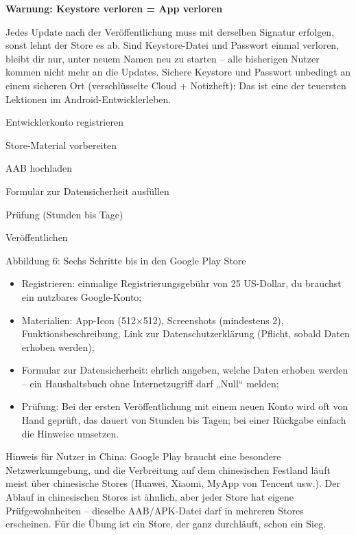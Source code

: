 \textbf{Warnung: Keystore verloren = App verloren}\par

Jedes Update nach der Veröffentlichung muss mit derselben Signatur erfolgen, sonst lehnt der Store es ab. Sind Keystore-Datei und Passwort einmal verloren, bleibt dir nur, unter neuem Namen neu zu starten – alle bisherigen Nutzer kommen nicht mehr an die Updates. Sichere Keystore und Passwort unbedingt an einem sicheren Ort (verschlüsselte Cloud + Notizheft): Das ist eine der teuersten Lektionen im Android-Entwicklerleben.


Entwicklerkonto registrieren

Store-Material vorbereiten

AAB hochladen

Formular zur Datensicherheit ausfüllen

Prüfung (Stunden bis Tage)

Veröffentlichen

\begin{center}\small\color{gray}Abbildung 6: Sechs Schritte bis in den Google Play Store\end{center}

\begin{itemize}
  \item Registrieren: einmalige Registrierungsgebühr von 25 US-Dollar, du brauchst ein nutzbares Google-Konto;
  \item Materialien: App-Icon (512×512), Screenshots (mindestens 2), Funktionsbeschreibung, Link zur Datenschutzerklärung (Pflicht, sobald Daten erhoben werden);
  \item Formular zur Datensicherheit: ehrlich angeben, welche Daten erhoben werden – ein Haushaltsbuch ohne Internetzugriff darf „Null“ melden;
  \item Prüfung: Bei der ersten Veröffentlichung mit einem neuen Konto wird oft von Hand geprüft, das dauert von Stunden bis Tagen; bei einer Rückgabe einfach die Hinweise umsetzen.
\end{itemize}

Hinweis für Nutzer in China: Google Play braucht eine besondere Netzwerkumgebung, und die Verbreitung auf dem chinesischen Festland läuft meist über chinesische Stores (Huawei, Xiaomi, MyApp von Tencent usw.). Der Ablauf in chinesischen Stores ist ähnlich, aber jeder Store hat eigene Prüfgewohnheiten – dieselbe AAB/APK-Datei darf in mehreren Stores erscheinen. Für die Übung ist ein Store, der ganz durchläuft, schon ein Sieg.

